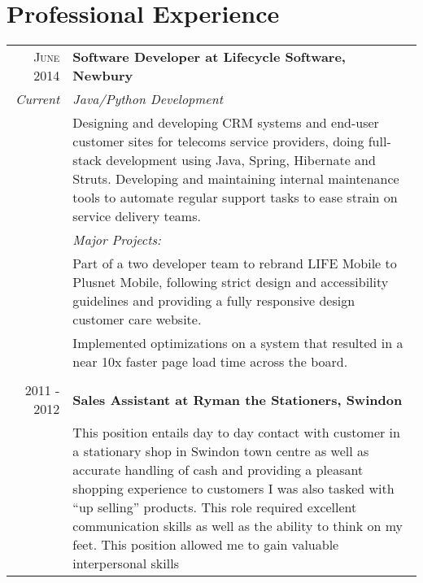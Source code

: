 \section{Professional Experience}
\begin{tabular}{r|p{11cm}}
	\textsc{June 2014} & \textbf{Software Developer at Lifecycle Software, Newbury} \\
	\emph{Current} & \emph{Java/Python Development} \\

	&\footnotesize{Designing and developing CRM systems and end-user customer sites for telecoms service providers, doing full-stack development using Java, Spring, Hibernate and Struts. Developing and maintaining internal maintenance tools to automate regular support tasks to ease strain on service delivery teams.} \\
	&\emph{Major Projects:} \\
	&\tabitem Part of a two developer team to rebrand LIFE Mobile to Plusnet Mobile, following strict design and accessibility guidelines and providing a fully responsive design customer care website. \\
	&\tabitem Implemented optimizations on a system that resulted in a near 10x faster page load time across the board. \\
	\multicolumn{2}{c}{} \\

	\textsc{2011 - 2012} & \textbf{Sales Assistant at Ryman the Stationers, Swindon} \\
	&\footnotesize{This position entails day to day contact with customer in a stationary shop in Swindon town centre as well as accurate handling of cash and providing a pleasant shopping experience to customers I was also tasked with “up selling” products. This role required excellent communication skills as well as the ability to think on my feet. This position allowed me to gain valuable interpersonal skills} \\

\end{tabular}
